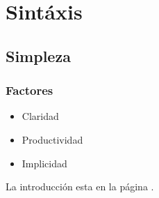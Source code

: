 \documentclass{article}
\begin{document}
\section{Sintáxis}\label{sec:syntax}
\lipsum[1]
\lipsum[1]

\subsection{Simpleza}
\lipsum[1]
\subsubsection{Factores}
\begin{itemize}
	\item Claridad
	\item Productividad
	\item Implicidad
\end{itemize}
La introducción esta en la página \pageref{sec:intro}.
\end{document}
